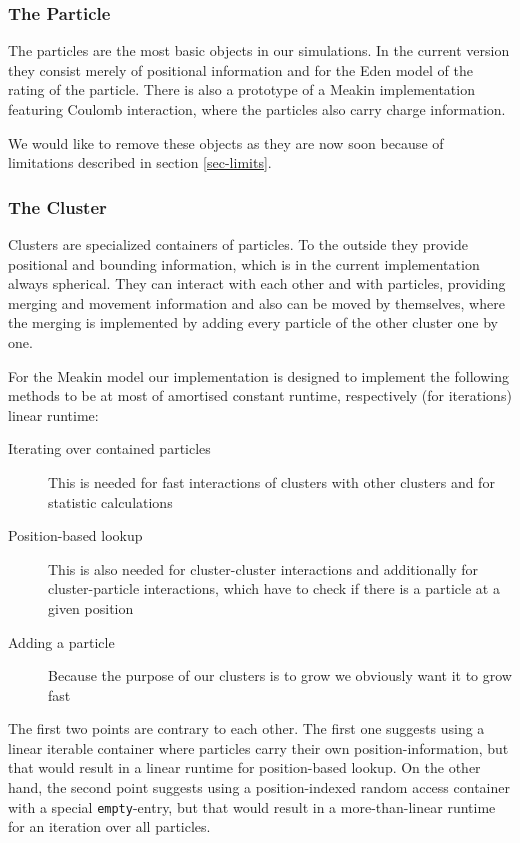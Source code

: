 \documentclass[twocolumn,10pt]{scrartcl}
\begin{document}
            \subsubsection*{The Particle}
                The particles are the most basic objects in our simulations. In the current version they consist merely
                of positional information and for the Eden model of the rating of the particle. There is also a
                prototype of a Meakin implementation featuring Coulomb interaction, where the particles also carry
                charge information.

                We would like to remove these objects as they are now soon because of limitations described in section
                \ref{sec-limits}.

            \subsubsection{The Cluster}
                Clusters are specialized containers of particles. To the outside they provide positional and bounding
                information, which is in the current implementation always spherical. They can interact with each other
                and with particles, providing merging and movement information and also can be moved by themselves,
                where the merging is implemented by adding every particle of the other cluster one by one.
            
                For the Meakin model our implementation is designed to implement the following methods to be at most
                of amortised constant runtime, respectively (for iterations) linear runtime:
                \begin{description}
                    \item[Iterating over contained particles] This is needed for fast interactions of clusters with
                        other clusters and for statistic calculations
                    \item[Position-based lookup] This is also needed for cluster-cluster interactions and additionally
                        for cluster-particle interactions, which have to check if there is a particle at a given
                        position
                    \item[Adding a particle] Because the purpose of our clusters is to grow we obviously want it to grow
                        fast
                \end{description}
                The first two points are contrary to each other. The first one suggests using a linear iterable
                container where particles carry their own position-information, but that would result in a linear
                runtime for position-based lookup. On the other hand, the second point suggests using a position-indexed
                random access container with a special \lstinline'empty'-entry, but that would result in a
                more-than-linear runtime for an iteration over all particles.
\end{document}
